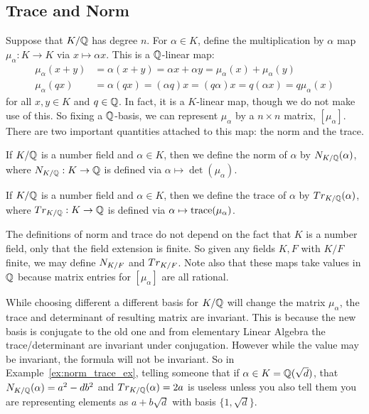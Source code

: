 \subsection{Trace and Norm \label{subsec:trace_norm}}


Suppose that $K/\mathbb{Q}$ has degree $n$. For $\alpha \in K$, define the multiplication by $\alpha$ map $\mu_\alpha: K \to K$ via $x \mapsto \alpha x$. This is a $\mathbb{Q}$-linear map:
	\[
	\begin{split}
	\mu_\alpha(x+y)&= \alpha(x+y)= \alpha x + \alpha y= \mu_\alpha(x) + \mu_\alpha(y) \\
	\mu_\alpha(qx)&= \alpha(qx)= (\alpha q)x= (q\alpha)x= q(\alpha x)= q \mu_\alpha(x)
	\end{split}
	\]
for all $x,y \in K$ and $q \in \mathbb{Q}$.
In fact, it is a $K$-linear map, though we do not make use of this. So fixing a $\mathbb{Q}$-basis, we can represent $\mu_\alpha$ by a $n \times n$ matrix, $[\mu_\alpha]$. There are two important quantities attached to this map: the norm and the trace. 


\begin{dfn}[Norm]
If $K/\mathbb{Q}$ is a number field and $\alpha \in K$, then we define the norm of $\alpha$ by $N_{K/\mathbb{Q}}(\alpha)$, where $N_{K/\mathbb{Q}}: K \to \mathbb{Q}$ is defined via $\alpha \mapsto \det(\mu_\alpha)$. 
\end{dfn}


\begin{dfn}[Trace]
If $K/\mathbb{Q}$ is a number field and $\alpha \in K$, then we define the trace of $\alpha$ by $Tr_{K/\mathbb{Q}}(\alpha)$, where $Tr_{K/\mathbb{Q}}: K \to \mathbb{Q}$ is defined via $\alpha \mapsto \operatorname{trace}(\mu_\alpha)$. 
\end{dfn}


\begin{rem} \label{rem:norm_trace_q}
The definitions of norm and trace do not depend on the fact that $K$ is a number field, only that the field extension is finite. So given any fields $K,F$ with $K/F$ finite, we may define $N_{K/F}$ and $Tr_{K/F}$. Note also that these maps take values in $\mathbb{Q}$ because matrix entries for $[\mu_\alpha]$ are all rational. 
\end{rem}


\begin{rem}
While choosing different a different basis for $K/\mathbb{Q}$ will change the matrix $\mu_\alpha$, the trace and determinant of resulting matrix are invariant. This is because the new basis is conjugate to the old one and from elementary Linear Algebra the trace/determinant are invariant under conjugation. However while the value may be invariant, the formula will not be invariant. So in Example~\ref{ex:norm_trace_ex}, telling someone that if $\alpha \in K= \mathbb{Q}(\sqrt{d})$, that $N_{K/\mathbb{Q}}(\alpha)= a^2 - db^2$ and $Tr_{K/\mathbb{Q}}(\alpha)= 2a$ is useless unless you also tell them you are representing elements as $a + b\sqrt{d}$ with basis $\{ 1, \sqrt{d} \}$. 
\end{rem}


